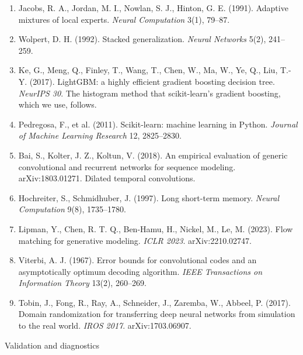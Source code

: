 \documentclass[10pt,a4paper]{article}
\begin{document}
\begin{enumerate}\setlength{\itemsep}{2pt}
\setcounter{enumi}{2}

\item Jacobs, R. A., Jordan, M. I., Nowlan, S. J., Hinton, G. E. (1991). Adaptive mixtures of local
   experts. \emph{Neural Computation} 3(1), 79–87.

\item Wolpert, D. H. (1992). Stacked generalization. \emph{Neural Networks} 5(2), 241–259.

\item Ke, G., Meng, Q., Finley, T., Wang, T., Chen, W., Ma, W., Ye, Q., Liu, T.-Y. (2017). LightGBM:
   a highly efficient gradient boosting decision tree. \emph{NeurIPS 30}. The histogram method that
   scikit-learn's gradient boosting, which we use, follows.

\item Pedregosa, F., et al. (2011). Scikit-learn: machine learning in Python. \emph{Journal of Machine
   Learning Research} 12, 2825–2830.

\item Bai, S., Kolter, J. Z., Koltun, V. (2018). An empirical evaluation of generic convolutional
   and recurrent networks for sequence modeling. arXiv:1803.01271. Dilated temporal convolutions.

\item Hochreiter, S., Schmidhuber, J. (1997). Long short-term memory. \emph{Neural Computation} 9(8),
   1735–1780.

\item Lipman, Y., Chen, R. T. Q., Ben-Hamu, H., Nickel, M., Le, M. (2023). Flow matching for
   generative modeling. \emph{ICLR 2023}. arXiv:2210.02747.

\item Viterbi, A. J. (1967). Error bounds for convolutional codes and an asymptotically optimum
    decoding algorithm. \emph{IEEE Transactions on Information Theory} 13(2), 260–269.

\item Tobin, J., Fong, R., Ray, A., Schneider, J., Zaremba, W., Abbeel, P. (2017). Domain
    randomization for transferring deep neural networks from simulation to the real world.
    \emph{IROS 2017}. arXiv:1703.06907.

\end{enumerate}


Validation and diagnostics
\end{document}
